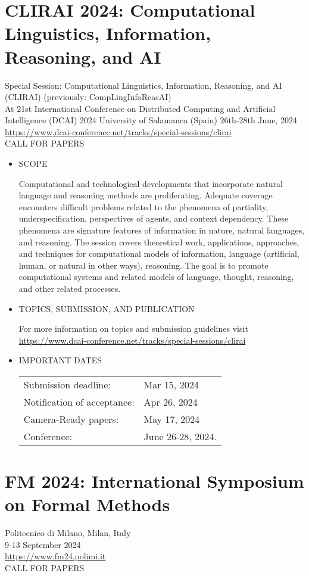 \documentclass[prodmode,acmtecs]{acmsmall} %
\begin{document}
\section{CLIRAI 2024: Computational Linguistics, Information, Reasoning, and AI}\label{CLIRAI2024}  Special Session: Computational Linguistics, Information, Reasoning, and AI (CLIRAI) (previously: CompLingInfoReasAI) \\ 
  At 21st International Conference on Distributed Computing and Artificial  Intelligence (DCAI) 2024 University of Salamanca (Spain) 26th-28th June, 2024\\ 
  \href{https://www.dcai-conference.net/tracks/special-sessions/clirai}{https://www.dcai-conference.net/tracks/special-sessions/clirai}\\ 
CALL FOR PAPERS 

\begin{itemize}\item  SCOPE 
 
  Computational and technological developments that incorporate natural language and reasoning methods are proliferating. Adequate coverage encounters difficult problems related to the phenomena of partiality, underspecification, perspectives of agents, and context dependency. These phenomena are signature features of information in nature, natural languages, and reasoning. The session covers theoretical work, applications, approaches, and techniques for computational models of information, language (artificial, human, or natural in other ways), reasoning. The goal is to promote computational systems and related models of language, thought, reasoning, and other related processes. 
 
\item  TOPICS, SUBMISSION, AND PUBLICATION 
 
  For more information on topics and submission guidelines visit \href{https://www.dcai-conference.net/tracks/special-sessions/clirai}{https://www.dcai-conference.net/tracks/special-sessions/clirai}  
 
\item  IMPORTANT DATES 
 
\begin{tabulary}{\linewidth}{LL}Submission deadline:  & Mar 15, 2024 \\
Notification of acceptance:  & Apr 26, 2024 \\
Camera-Ready papers:  & May 17, 2024 \\
Conference:  & June 26-28, 2024. \\
\end{tabulary}
 
\end{itemize}\section{FM 2024: International Symposium on Formal Methods}\label{FM2024}  Politecnico di Milano, Milan, Italy\\ 
  9-13 September 2024\\ 
  \href{https://www.fm24.polimi.it}{https://www.fm24.polimi.it}\\ 
CALL FOR PAPERS 
\end{document}
